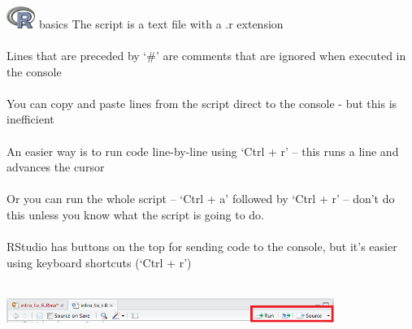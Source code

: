 \documentclass[xcolor=svgnames]{beamer}\usepackage[]{graphicx}\usepackage[]{color}
\begin{document}
\begin{frame}{\includegraphics[width=0.07\textwidth]{Rlogo.jpg} \hspace{0.01in} basics}
The script is a text file with a .r extension \\~\\
Lines that are preceded by `\#' are comments that are ignored when executed in the console \\~\\
You can copy and paste lines from the script direct to the console - but this is inefficient \\~\\
An easier way is to run code line-by-line using `Ctrl + r' -- this runs a line and advances the cursor\\~\\
Or you can run the whole script -- `Ctrl + a' followed by `Ctrl + r' -- don't do this unless you know what the script is going to do.\\~\\
RStudio has buttons on the top for sending code to the console, but it's easier using keyboard shortcuts (`Ctrl + r')\\~\\
\centerline{\includegraphics[width = 0.8\textwidth]{rstudio_run.png}}
\end{frame}
\end{document}
